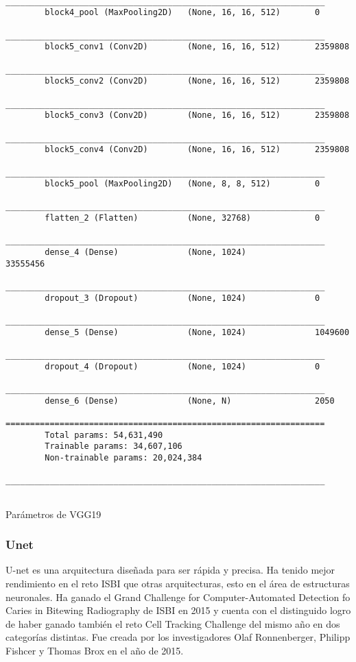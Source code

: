 \begin{table}[H]
\begin{lstlisting}
        _________________________________________________________________
        block4_pool (MaxPooling2D)   (None, 16, 16, 512)       0         
        _________________________________________________________________
        block5_conv1 (Conv2D)        (None, 16, 16, 512)       2359808   
        _________________________________________________________________
        block5_conv2 (Conv2D)        (None, 16, 16, 512)       2359808   
        _________________________________________________________________
        block5_conv3 (Conv2D)        (None, 16, 16, 512)       2359808   
        _________________________________________________________________
        block5_conv4 (Conv2D)        (None, 16, 16, 512)       2359808   
        _________________________________________________________________
        block5_pool (MaxPooling2D)   (None, 8, 8, 512)         0         
        _________________________________________________________________
        flatten_2 (Flatten)          (None, 32768)             0         
        _________________________________________________________________
        dense_4 (Dense)              (None, 1024)              33555456  
        _________________________________________________________________
        dropout_3 (Dropout)          (None, 1024)              0         
        _________________________________________________________________
        dense_5 (Dense)              (None, 1024)              1049600   
        _________________________________________________________________
        dropout_4 (Dropout)          (None, 1024)              0         
        _________________________________________________________________
        dense_6 (Dense)              (None, N)                 2050      
        =================================================================
        Total params: 54,631,490
        Trainable params: 34,607,106
        Non-trainable params: 20,024,384
        _________________________________________________________________
        
    \end{lstlisting}
    \caption{Parámetros de VGG19}
    \label{tabla:modelo}
\end{table}

\subsubsection{Unet}

U-net es una arquitectura diseñada para ser rápida y precisa. Ha tenido mejor
rendimiento en el reto ISBI que otras arquitecturas, esto en el área de
estructuras neuronales. Ha ganado el Grand Challenge for Computer-Automated
Detection fo Caries in Bitewing Radiography de ISBI en 2015 y cuenta con el
distinguido logro de haber ganado también el reto Cell Tracking Challenge del
mismo año en dos categorías distintas. Fue creada por los investigadores Olaf
Ronnenberger, Philipp Fishcer y Thomas Brox en el año de 2015.~\cite{Ronneberger2015}

